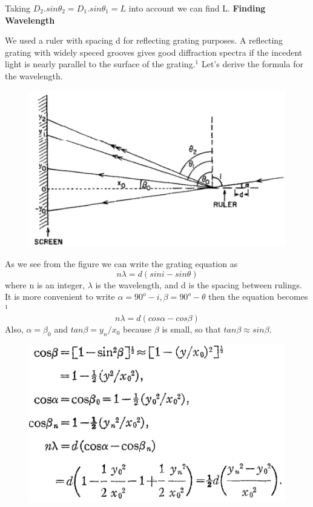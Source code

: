 \documentclass[10pt,a4paper]{article}
\begin{document}
{\par Taking $D_2.sin\theta_2=D_1.sin\theta_1=L$ into account we can find L.
\textbf{\small{Finding Wavelength}}
	\par We used a ruler with spacing d for reflecting grating purposes. A reflecting grating with widely speced grooves gives good diffraction spectra if the incedent light is nearly parallel to the surface of the grating.$^1$ Let's derive the formula for the wavelength.
\begin{figure}[H]
	\begin{center}
		\includegraphics[scale=0.9]{cetvel.png}
	\end{center}
\end{figure}
As we see from the figure we can write the grating equation as
\begin{equation}
n\lambda=d(sini-sin\theta)
\end{equation}
where n is an integer, $\lambda$ is the wavelength, and d is the spacing between rulings. It is more convenient to write $\alpha=90^o-i, \beta=90^o-\theta$ then the equation becomes$^1$
\begin{equation}
n\lambda=d(cos\alpha-cos\beta)
\end{equation}
Also, $\alpha=\beta_0$ and $tan\beta=y_n/x_0$ because $\beta$ is small, so that $tan\beta\approx sin\beta$.
\begin{figure}[H]
	\begin{center}
		\includegraphics[scale=0.7]{cet.png}

\end{center}
\end{figure}}
\end{document}
